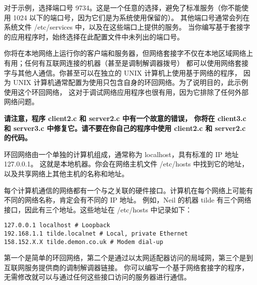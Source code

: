 \documentclass{ctexart}
\begin{document}
对于示例，选择端口号 9734。这是一个任意的选择，避免了标准服务（你不能使用 1024 以下的端口号，因为它们是为系统使用保留的）。
其他端口号通常会列在系统文件 /etc/services 中，以及在这些端口上提供的服务。
当你编写基于套接字的应用程序时，始终选择在此配置文件中未列出的端口号。  
  
你将在本地网络上运行你的客户端和服务器，但网络套接字不仅在本地区域网络上有用；任何有互联网连接的机器（甚至是调制解调器拨号）
都可以使用网络套接字与其他人通信。你甚至可以在独立的 UNIX 计算机上使用基于网络的程序，
因为 UNIX 计算机通常配置为使用只包含自身的环回网络。为了说明目的，此示例使用这个环回网络，
这对于调试网络应用程序也很有用，因为它排除了任何外部网络问题。  

{\bfseries 
请注意，程序 client2.c 和 server2.c 中有一个故意的错误，
你将在 client3.c 和 server3.c 中修复它。请不要在你自己的程序中使用 client2.c 和 server2.c 的代码。
}

环回网络由一个单独的计算机组成，通常称为 localhost，具有标准的 IP 地址127.0.0.1。
这就是本地机器。你会在网络主机文件 /etc/hosts 中找到它的地址，以及共享网络上其他主机的名称和地址。  
  
每个计算机通信的网络都有一个与之关联的硬件接口。计算机在每个网络上可能有不同的网络名称，肯定会有不同的 IP 地址。
例如，Neil 的机器 tilde 有三个网络接口，因此有三个地址。这些地址在 /etc/hosts 中记录如下：  
\begin{verbatim}  
127.0.0.1 localhost # Loopback  
192.168.1.1 tilde.localnet # Local, private Ethernet  
158.152.X.X tilde.demon.co.uk # Modem dial-up  
\end{verbatim}  
第一个是简单的环回网络，第二个是通过以太网适配器访问的局域网，第三个是到互联网服务提供商的调制解调器链接。
你可以编写一个基于网络套接字的程序，无需修改就可以与通过任何这些接口访问的服务器进行通信。  
\end{document}
